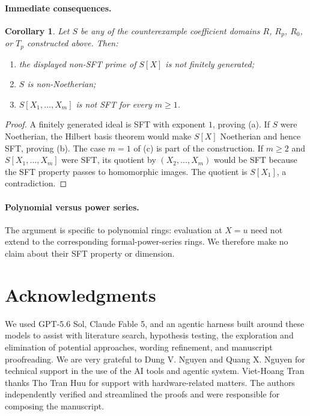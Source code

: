 \documentclass[11pt,reqno]{amsart}
\numberwithin{equation}{section}
\theoremstyle{plain}
\newtheorem{corollary}[theorem]{Corollary}
\theoremstyle{definition}
\theoremstyle{remark}
\begin{document}
\paragraph*{Immediate consequences.}
\begin{corollary}\label{cor:basic-consequences}
Let $S$ be any of the counterexample coefficient domains
$R$, $R_p$, $R_0$, or $T_p$ constructed above.  Then:
\begin{enumerate}[label=\textup{(\alph*)}]
\item the displayed non-SFT prime of $S[X]$ is not finitely generated;
\item $S$ is non-Noetherian;
\item $S[X_1,\ldots,X_m]$ is not SFT for every $m\geq1$.
\end{enumerate}
\end{corollary}

\begin{proof}
A finitely generated ideal is SFT with exponent $1$, proving (a).  If $S$
were Noetherian, the Hilbert basis theorem would make $S[X]$ Noetherian and
hence SFT, proving (b).  The case $m=1$ of (c) is part of the construction.
If $m\geq2$ and $S[X_1,\ldots,X_m]$ were SFT, its quotient by
$(X_2,\ldots,X_m)$ would be SFT because the SFT property passes to
homomorphic images.  The quotient is $S[X_1]$, a contradiction.
\end{proof}

\paragraph*{Polynomial versus power series.}
The argument is specific to polynomial rings: evaluation at $X=u$ need not
extend to the corresponding formal-power-series rings.  We therefore make no
claim about their SFT property or dimension.


\section*{Acknowledgments}
We used GPT-5.6 Sol, Claude Fable 5, and an agentic harness built around these
models to assist with literature search, hypothesis testing, the exploration
and elimination of potential approaches, wording refinement, and manuscript
proofreading.  We are very grateful to Dung V. Nguyen and Quang X. Nguyen for
technical support in the use of the AI tools and agentic system.  Viet-Hoang
Tran thanks Tho Tran Huu for support with hardware-related matters.  The
authors independently verified and streamlined the proofs and were responsible
for composing the manuscript.


\begingroup
\footnotesize
\raggedright

\endgroup
\end{document}
